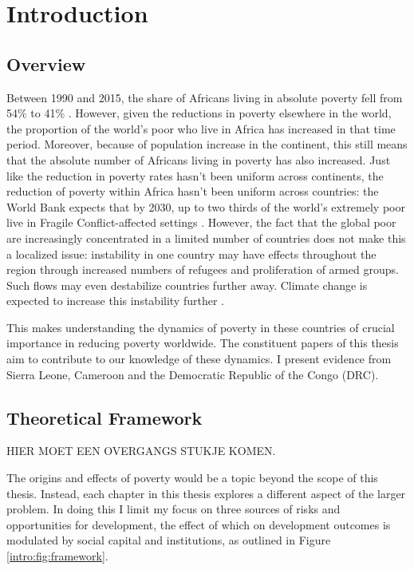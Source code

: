 \chapter{Introduction}
\section{Overview}



Between 1990 and 2015, the share of Africans living in absolute poverty fell from 54\% to 41\% \citep{Beegle2019}. However, given the reductions in poverty elsewhere in the world, the proportion of the world's poor who live in Africa has increased in that time period.  Moreover, because of population increase in the continent, this still means that the absolute number of Africans living in poverty has also increased. Just like the reduction in poverty rates hasn't been uniform across continents, the reduction of poverty within Africa hasn't been uniform across countries: the World Bank expects that by 2030, up to two thirds of the world's extremely poor live in Fragile Conflict-affected settings \citep{WorldBank2019}. However, the fact that the global poor are increasingly concentrated in a limited number of countries does not make this a localized issue: instability in one country may have effects throughout the region through increased numbers of refugees and proliferation of armed groups. Such flows may even destabilize countries further away. Climate change is expected to increase this instability further \citep{Burke2009}.

This makes understanding the dynamics of poverty in these countries of crucial importance in reducing poverty worldwide. The constituent papers of this thesis aim to contribute to our knowledge of these dynamics. I present evidence from Sierra Leone, Cameroon and the Democratic Republic of the Congo (DRC).


\section{Theoretical Framework}
HIER MOET EEN OVERGANGS STUKJE KOMEN.

The origins and effects of poverty would be a topic beyond the scope of this thesis. Instead, each chapter in this thesis explores a different aspect of the larger problem. In doing this I limit my focus on three sources of risks and opportunities for development, the effect of which on development outcomes is modulated by social capital and institutions, as outlined in Figure \ref{intro:fig:framework}. 

